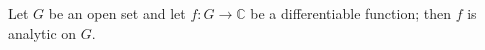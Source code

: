 Let $G$ be an open set and let $f: G \rightarrow \mathbb{C}$ be a differentiable function; then $f$ is analytic on $G$.
